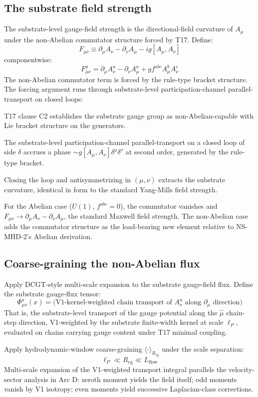 \documentclass[11pt,a4paper]{article}
\begin{document}
\subsection{The substrate field strength}

The substrate-level gauge-field strength is the directional-field curvature of $A_\mu$ under the non-Abelian commutator structure forced by T17. Define:
\[
F_{\mu\nu} \equiv \partial_\mu A_\nu - \partial_\nu A_\mu - ig[A_\mu, A_\nu]
\]
componentwise:
\[
F_{\mu\nu}^a = \partial_\mu A_\nu^a - \partial_\nu A_\mu^a + g f^{abc} A_\mu^b A_\nu^c
\]
The non-Abelian commutator term is forced by the rule-type bracket structure. The forcing argument runs through substrate-level participation-channel parallel-transport on closed loops:

T17 clause C2 establishes the substrate gauge group as non-Abelian-capable with Lie bracket structure on the generators.

The substrate-level participation-channel parallel-transport on a closed loop of side $\delta$ accrues a phase $\sim g [A_\mu, A_\nu] \delta^\mu \delta^\nu$ at second order, generated by the rule-type bracket.

Closing the loop and antisymmetrizing in $(\mu, \nu)$ extracts the substrate curvature, identical in form to the standard Yang-Mills field strength.

For the Abelian case ($U(1)$, $f^{abc} = 0$), the commutator vanishes and $F_{\mu\nu} \to \partial_\mu A_\nu - \partial_\nu A_\mu$, the standard Maxwell field strength. The non-Abelian case adds the commutator structure as the load-bearing new element relative to NS-MHD-2's Abelian derivation.

\subsection{Coarse-graining the non-Abelian flux}

Apply DCGT-style multi-scale expansion to the substrate gauge-field flux. Define the substrate gauge-flux tensor:
\[
\Phi_{\mu\nu}^a(x) = \text{(V1-kernel-weighted chain transport of } A_\nu^a \text{ along } \partial_\mu \text{ direction)}
\]
That is, the substrate-level transport of the gauge potential along the $\hat\mu$ chain-step direction, V1-weighted by the substrate finite-width kernel at scale $\ell_P$, evaluated on chains carrying gauge content under T17 minimal coupling.

Apply hydrodynamic-window coarse-graining $\langle \cdot \rangle_{R_\mathrm{cg}}$ under the scale separation:
\[
\ell_P \ll R_\mathrm{cg} \ll L_\mathrm{flow}
\]
Multi-scale expansion of the V1-weighted transport integral parallels the velocity-sector analysis in Arc D: zeroth moment yields the field itself; odd moments vanish by V1 isotropy; even moments yield successive Laplacian-class corrections.
\end{document}
